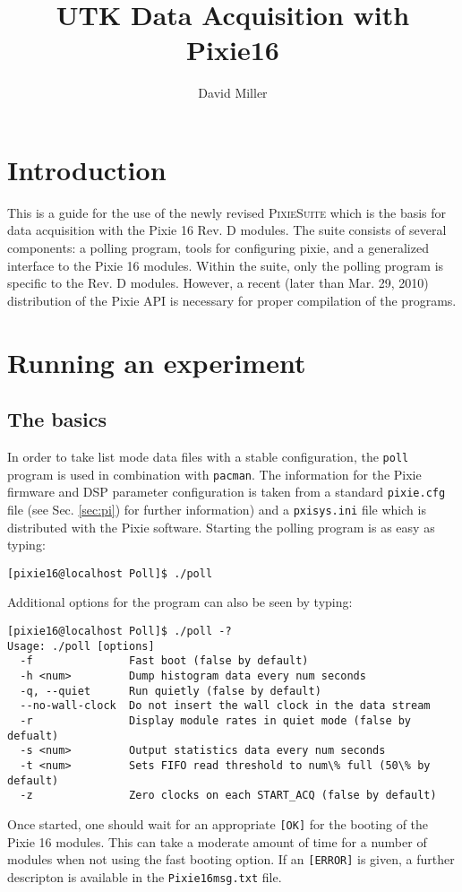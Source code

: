 \documentclass[10pt]{article}
\title{UTK Data Acquisition with Pixie16}
\author{David Miller}
\newcommand{\okay}{\texttt{[OK]}}
\newcommand{\error}{\texttt{[ERROR]}}
\begin{document}
\maketitle
\setcounter{tocdepth}{1}
\setlength{\LTcapwidth}{\textwidth}
\tableofcontents
\section{Introduction}
This is a guide for the use of the newly revised \textsc{PixieSuite} which is 
the basis for data acquisition with the Pixie 16 Rev. D modules. The suite 
consists of several components: a polling program, tools for configuring pixie, 
and a generalized interface to the Pixie 16 modules. Within the suite, only the 
polling program is specific to the Rev. D modules. However, a recent (later 
than Mar. 29, 2010) distribution of the Pixie API is necessary for proper 
compilation of the programs.
\section{Running an experiment}
\subsection{The basics}
In order to take list mode data files with a stable configuration, the 
\texttt{poll} program is used in combination with \texttt{pacman}. The 
information for the Pixie firmware and DSP parameter configuration is taken 
from a standard \texttt{pixie.cfg} file (see Sec. \ref{sec:pi}) for further 
information) and a \texttt{pxisys.ini} file which is distributed with the Pixie 
software. Starting the polling program is as easy as typing:
\begin{verbatim}
[pixie16@localhost Poll]$ ./poll
\end{verbatim}
Additional options for the program can also be seen by typing:
\begin{verbatim}
[pixie16@localhost Poll]$ ./poll -?
Usage: ./poll [options]
  -f               Fast boot (false by default)
  -h <num>         Dump histogram data every num seconds
  -q, --quiet      Run quietly (false by default)
  --no-wall-clock  Do not insert the wall clock in the data stream
  -r               Display module rates in quiet mode (false by defualt)
  -s <num>         Output statistics data every num seconds
  -t <num>         Sets FIFO read threshold to num\% full (50\% by default)
  -z               Zero clocks on each START_ACQ (false by default)
\end{verbatim}
Once started, one should wait for an appropriate \okay{} for the booting of the 
Pixie 16 modules. This can take a moderate amount of time for a number of 
modules when not using the fast booting option. If an \error{} is given, a 
further descripton is available in the \texttt{Pixie16msg.txt} file.
\end{document}

